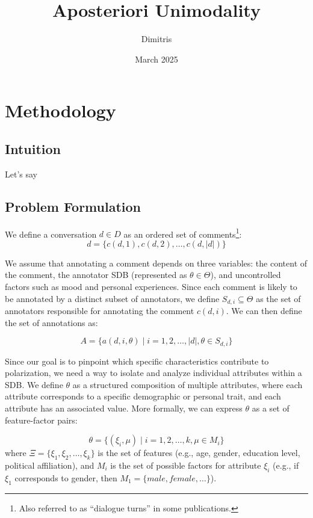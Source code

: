\documentclass{article}
\title{Aposteriori Unimodality}
\author{Dimitris }
\date{March 2025}
\begin{document}
\maketitle

\section{Methodology}

\subsection{Intuition}

Let's say 

\subsection{Problem Formulation}

We define a conversation $d \in D$ as an ordered set of comments\footnote{Also referred to as “dialogue turns” in some publications.}:
\begin{equation}
    d = \{c(d, 1), c(d, 2), \ldots, c(d, \lvert d \rvert)\}
\end{equation}


We assume that annotating a comment depends on three variables: the content of the comment, the annotator \ac{SDB} (represented as $\theta \in \Theta$), and uncontrolled factors such as mood and personal experiences. Since each comment is likely to be annotated by a distinct subset of annotators, we define $S_{d, i} \subseteq \Theta$ as the set of annotators responsible for annotating the comment $c(d, i)$. We can then define the set of annotations as:

\begin{equation}
    A = \{a(d, i, \theta) \mid i=1, 2, \ldots, \lvert d \rvert, \theta \in S_{d, i} \}
\end{equation}

Since our goal is to pinpoint which specific characteristics contribute to polarization, we need a way to isolate and analyze individual attributes within a \ac{SDB}. We define $\theta$ as a structured composition of multiple attributes, where each attribute corresponds to a specific demographic or personal trait, and each attribute has an associated value. More formally, we can express $\theta$ as a set of feature-factor pairs:

\begin{equation}
    \theta = \{(\xi_i, \mu) \mid i=1, 2, \ldots, k \mathpunct{,} \mu \in M_i\}
\end{equation} 
\noindent where $\Xi=\{\xi_1, \xi_2, \ldots, \xi_k\}$ is the set of features (e.g., age, gender, education level, political affiliation), and $M_i$ is the set of possible factors for attribute $\xi_i$ (e.g., if $\xi_1$ corresponds to gender, then $M_1=\{\textit{male}, \textit{female}, \ldots\}$).
\end{document}
